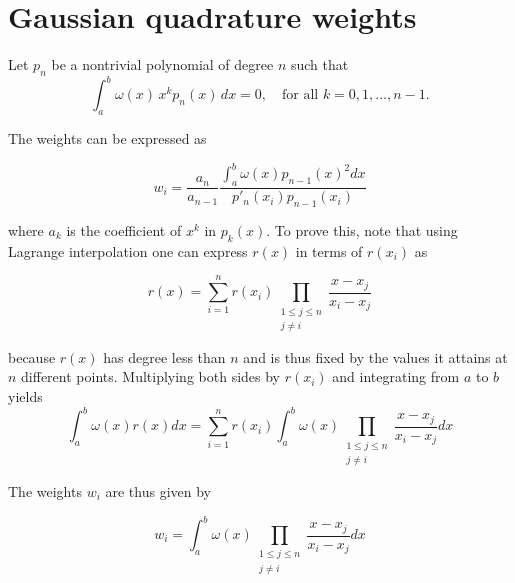 \appendices
\section{Gaussian quadrature weights}
\label{appendixA}
Let $p_n$ be a nontrivial polynomial of degree $n$ such that
\begin{equation}
    \int_a^b \omega(x) \, x^k p_n(x) \, dx = 0, \quad \text{for all } k = 0, 1, \ldots, n - 1.
\end{equation}

The weights can be expressed as

\begin{equation}
    \label{eqnote1}
    w_{i} = \frac{a_{n}}{a_{n-1}}\frac{\int_{a}^{b}\omega(x)p_{n-1}\left(x\right)^{2}dx}{p'_{n}(x_{i})p_{n-1}(x_{i})}
\end{equation}

where $a_{k}$ is the coefficient of $x^{k}$ in $p_{k}(x)$. To prove this, note that using Lagrange interpolation one can express $r(x)$ in terms of $r(x_{i})$ as

\begin{equation}
r(x) = \sum_{i=1}^{n}r(x_{i})\prod_{\begin{smallmatrix}1\leq j\leq n\\j\neq i\end{smallmatrix}}\frac{x-x_{j}}{x_{i}-x_{j}}
\end{equation}

because $r(x)$ has degree less than $n$ and is thus fixed by the values it attains at $n$ different points. Multiplying both sides by $r(x_i)$ and integrating from $a$ to $b$ yields
\begin{equation}
\int_{a}^{b}\omega(x)r(x)dx= \sum_{i=1}^{n}r(x_{i})\int_{a}^{b}\omega(x)\prod_{\begin{smallmatrix}1\leq j\leq n\\j\neq i\end{smallmatrix}}\frac{x-x_{j}}{x_{i}-x_{j}}dx
\end{equation}

The weights $w_i$ are thus given by

\begin{equation}
    \label{eqnote2}
w_{i} = \int_{a}^{b}\omega(x)\prod_{\begin{smallmatrix}1\leq j\leq n\\j\neq i\end{smallmatrix}}\frac{x-x_{j}}{x_{i}-x_{j}}dx
\end{equation}

